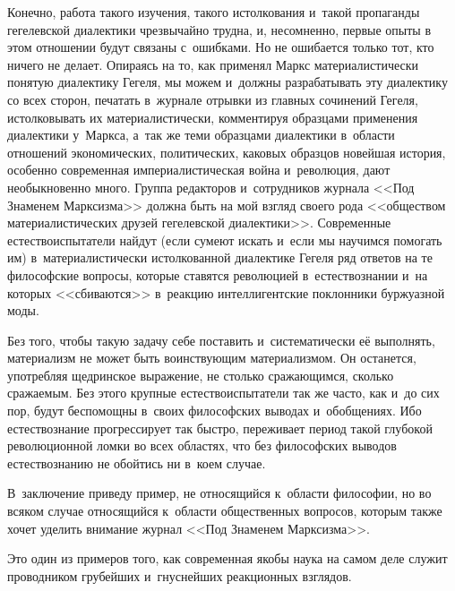 Конечно, работа такого изучения, такого истолкования и~такой пропаганды
гегелевской диалектики чрезвычайно трудна, и, несомненно, первые опыты в
этом отношении будут связаны с~ошибками. Но не ошибается только тот, кто
ничего не делает. Опираясь на то, как применял Маркс материалистически
понятую диалектику Гегеля, мы можем и~должны разрабатывать эту диалектику
со всех сторон, печатать в~журнале отрывки из главных сочинений Гегеля,
истолковывать их материалистически, комментируя образцами применения
диалектики у~Маркса, а~так же теми образцами диалектики в~области отношений
экономических, политических, каковых образцов новейшая история, особенно
современная империалистическая война и~революция, дают необыкновенно много.
Группа редакторов и~сотрудников журнала <<Под Знаменем Марксизма>> должна
быть на мой взгляд своего рода <<обществом материалистических друзей
гегелевской диалектики>>. Современные естествоиспытатели найдут (если сумеют
искать и~если мы научимся помогать им) в~материалистически истолкованной
диалектике Гегеля ряд ответов на те философские вопросы, которые ставятся
революцией в~естествознании и~на которых <<сбиваются>> в~реакцию
интеллигентские поклонники буржуазной моды.

Без того, чтобы такую задачу себе поставить и~систематически её выполнять,
материализм не может быть воинствующим материализмом. Он останется,
употребляя щедринское выражение, не столько сражающимся, сколько сражаемым.
Без этого крупные естествоиспытатели так же часто, как и~до сих пор, будут
беспомощны в~своих философских выводах и~обобщениях. Ибо естествознание
прогрессирует так быстро, переживает период такой глубокой революционной
ломки во всех областях, что без философских выводов естествознанию не
обойтись ни в~коем случае.

В~заключение приведу пример, не относящийся к~области философии, но во
всяком случае относящийся к~области общественных вопросов, которым также
хочет уделить внимание журнал <<Под Знаменем Марксизма>>.

Это один из примеров того, как современная якобы наука на самом деле служит
проводником грубейших и~гнуснейших реакционных взглядов.

